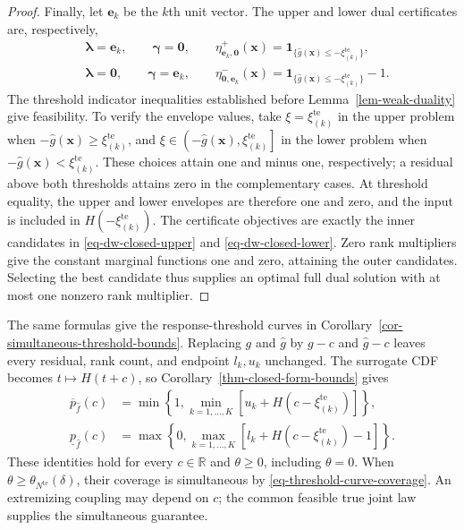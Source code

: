 \documentclass[review,11pt,3p,authoryear,nopreprintline]{elsarticle}
\begin{document}
\begin{proof}
  Finally, let $\bm e_k$ be the $k$th unit vector. The upper and lower dual certificates are, respectively,
  \begin{align*}
    &\bm\lambda=\bm e_k,\qquad \bm\gamma=\bm 0,\qquad
      \eta^+_{\bm e_k,\bm 0}(\bm x)
      =\mathbf1_{\{\hat g(\bm x)\le-\xi_{(k)}^{\mathrm{te}}\}},\\
    &\bm\lambda=\bm 0,\qquad \bm\gamma=\bm e_k,\qquad
      \eta^-_{\bm 0,\bm e_k}(\bm x)
      =\mathbf1_{\{\hat g(\bm x)\le-\xi_{(k)}^{\mathrm{te}}\}}-1.
  \end{align*}
  The threshold indicator inequalities established before Lemma~\ref{lem-weak-duality} give feasibility. To verify the envelope values, take $\xi=\xi_{(k)}^{\mathrm{te}}$ in the upper problem when $-\hat g(\bm x)\ge\xi_{(k)}^{\mathrm{te}}$, and $\xi\in\left(-\hat g(\bm x),\xi_{(k)}^{\mathrm{te}}\right]$ in the lower problem when $-\hat g(\bm x)<\xi_{(k)}^{\mathrm{te}}$. These choices attain one and minus one, respectively; a residual above both thresholds attains zero in the complementary cases. At threshold equality, the upper and lower envelopes are therefore one and zero, and the input is included in $H\left(-\xi_{(k)}^{\mathrm{te}}\right)$. The certificate objectives are exactly the inner candidates in \eqref{eq-dw-closed-upper} and \eqref{eq-dw-closed-lower}. Zero rank multipliers give the constant marginal functions one and zero, attaining the outer candidates. Selecting the best candidate thus supplies an optimal full dual solution with at most one nonzero rank multiplier.
\end{proof}

The same formulas give the response-threshold curves in Corollary~\ref{cor-simultaneous-threshold-bounds}. Replacing $g$ and $\hat g$ by $g-c$ and $\hat g-c$ leaves every residual, rank count, and endpoint $l_k,u_k$ unchanged. The surrogate CDF becomes $t\mapsto H(t+c)$, so Corollary~\ref{thm-closed-form-bounds} gives
\begin{align}
  \overline p_{\hat f}(c)
    &=\min\left\{1,\min_{k=1,\ldots,K}\left[u_k+H\left(c-\xi_{(k)}^{\mathrm{te}}\right)\right]\right\},
    \label{eq-threshold-closed-upper}\\
  \underline p_{\hat f}(c)
    &=\max\left\{0,\max_{k=1,\ldots,K}\left[l_k+H\left(c-\xi_{(k)}^{\mathrm{te}}\right)-1\right]\right\}.
    \label{eq-threshold-closed-lower}
\end{align}
These identities hold for every $c\in\mathbb R$ and $\theta\ge0$, including $\theta=0$. When $\theta\ge\theta_{N^{\mathrm{te}}}(\delta)$, their coverage is simultaneous by \eqref{eq-threshold-curve-coverage}. An extremizing coupling may depend on $c$; the common feasible true joint law supplies the simultaneous guarantee.
\end{document}
